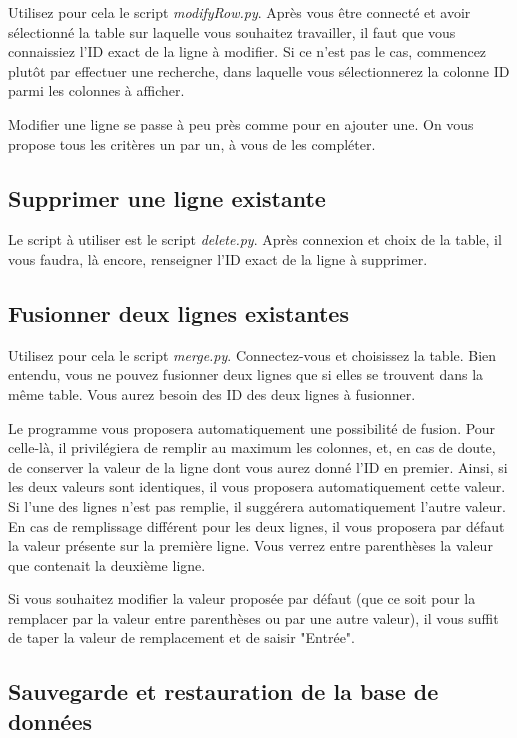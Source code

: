 \documentclass[12pt,a4paper]{article}
\begin{document}
    Utilisez pour cela le script \emph{modifyRow.py}.
    Après vous être connecté et avoir sélectionné la table sur laquelle vous souhaitez travailler,
    il faut que vous connaissiez l'ID exact de la ligne à modifier. Si ce n'est pas le cas,
    commencez plutôt par effectuer une recherche, dans laquelle vous sélectionnerez la colonne ID
    parmi les colonnes à afficher.

    Modifier une ligne se passe à peu près comme pour en ajouter une. On vous propose tous les critères
    un par un, à vous de les compléter.


\bigskip
\subsection{Supprimer une ligne existante}

    Le script à utiliser est le script \emph{delete.py}.
    Après connexion et choix de la table, il vous faudra, là encore, renseigner l'ID exact de la ligne
    à supprimer.


\bigskip
\subsection{Fusionner deux lignes existantes}

    Utilisez pour cela le script \emph{merge.py}.
    Connectez-vous et choisissez la table. Bien entendu, vous ne pouvez fusionner deux lignes
    que si elles se trouvent dans la même table. Vous aurez besoin des ID des deux lignes à fusionner.
    
    Le programme vous proposera automatiquement une possibilité de fusion. Pour celle-là, il privilégiera
    de remplir au maximum les colonnes, et, en cas de doute, de conserver la valeur de la ligne dont vous
    aurez donné l'ID en premier.
    Ainsi, si les deux valeurs sont identiques, il vous proposera automatiquement cette valeur. Si l'une
    des lignes n'est pas remplie, il suggérera automatiquement l'autre valeur. En cas de remplissage différent
    pour les deux lignes, il vous proposera par défaut la valeur présente sur la première ligne. Vous verrez
    entre parenthèses la valeur que contenait la deuxième ligne.

    Si vous souhaitez modifier la valeur proposée par défaut (que ce soit pour la remplacer par la valeur
    entre parenthèses ou par une autre valeur), il vous suffit de taper la valeur de remplacement et de saisir
    "Entrée".


\bigskip
\subsection{Sauvegarde et restauration de la base de données}
    
\end{document}
